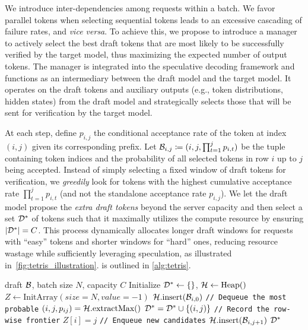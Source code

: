 

We introduce inter-dependencies among requests within a batch.
We favor parallel tokens when selecting sequential tokens leads to an excessive cascading of failure rates, and \textit{vice versa}.
To achieve this, we propose to introduce a manager to actively select the best draft tokens that are most likely to be successfully verified by the target model, thus maximizing the expected number of output tokens.
The manager is integrated into the speculative decoding framework and functions as an intermediary between the draft model and the target model.
It operates on the draft tokens and auxiliary outputs (e.g., token distributions, hidden states) from the draft model and strategically selects those that will be sent for verification by the target model.


At each step, define $p_{i,j}$ the conditional acceptance rate of the token at index $(i,j)$ given its corresponding prefix.
Let ${\mathcal{B}}_{i,j} \coloneqq (i, j, \prod_{t=1}^{j} p_{i,t})$ be the tuple containing token indices and the probability of all selected tokens in row $i$ up to $j$ being accepted. 
Instead of simply selecting a fixed window of draft tokens for verification, we \textit{greedily} look for tokens with the highest cumulative acceptance rate $\prod_{t=1}^{j} p_{i,t}$ (and not the standalone acceptance rate $p_{i,j}$).
We let the draft model  propose the \textit{extra draft tokens} beyond the server capacity and then select a set ${\mathcal{D}}^*$ of tokens such that it maximally utilizes the compute resource by ensuring $|{\mathcal{D}}^*| = C$. 
This process dynamically allocates longer draft windows for requests with ``easy'' tokens and shorter windows for ``hard'' ones, reducing resource wastage while sufficiently leveraging speculation, as illustrated in~\cref{fig:tetris_illustration}. 
\alg{} is outlined in \cref{alg:tetris}.
\begin{algorithm}[!ht]
    \caption{\alg{}}
    \label{alg:tetris}
    \begin{algorithmic}[1]
         draft ${\mathcal{B}}$, batch size $N$, capacity $C$
        \STATE Initialize ${\mathcal{D}}^* \gets \{\}$, ${\mathcal{H}} \gets \text{Heap}()$
        \STATE $Z \gets \text{InitArray}(size=N, value=-1)$
            \STATE ${\mathcal{H}}.\text{insert}({\mathcal{B}}_{i, 0})$
        \ENDFOR
        \REPEAT
            \STATE \texttt{// Dequeue the most probable}
            \STATE $(i,j,p_{ij}) = {\mathcal{H}}.\text{extractMax}()$
            \STATE ${\mathcal{D}}^* = {\mathcal{D}}^* \cup \{(i,j)\}$
            \STATE \texttt{// Record the row-wise frontier}
            \STATE $Z[i]=j$
            \STATE \texttt{// Enqueue new candidates}
            \STATE ${\mathcal{H}}.\text{insert}({\mathcal{B}}_{i,j + 1})$
         ${\mathcal{D}}^*$
    \end{algorithmic}
\end{algorithm}


